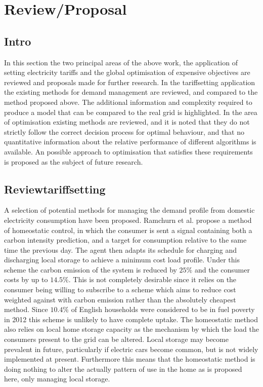 \documentclass[a4paper, 10 pt, conference]{ieeeconf}  %
\begin{document}





\onecolumn
\large
\section{Review/Proposal}
\doublespacing
\subsection{Intro}
In this section the two principal areas of the above work, the application of setting electricity tariffs and the global optimisation of expensive objectives are reviewed and proposals made for further research.
In the tariffsetting application the existing methods for demand management are reviewed, and compared to the method proposed above. The additional information and complexity required to produce a model that can be compared to the real grid is highlighted.
In the area of optimisation existing methods are reviewed, and it is noted that they do not strictly follow the correct decision process for optimal behaviour, and that no quantitative information about the relative performance of different algorithms is available. An possible approach to optimisation that satisfies these requirements is proposed as the subject of future research.


\subsection{Reviewtariffsetting}
\label{reviewtariffset}
A selection of potential methods for managing the demand profile from domestic electricity consumption have been proposed. Ramchurn et al. \cite{ramchurn2011agenthomeo} propose a method of homeostatic control, in which the consumer is sent a signal containing both a carbon intensity prediction, and a target for consumption relative to the same time the previous day. The agent then adapts its schedule for charging and discharging local storage to achieve a minimum cost load profile. Under this scheme the carbon emission of the system is reduced by $25\%$ and the consumer costs by up to $14.5\%$. This is not completely desirable since it relies on the consumer being willing to subscribe to a scheme which aims to reduce cost weighted against with carbon emission rather than the absolutely cheapest method. Since $10.4\%$ of English households were considered to be in fuel poverty in 2012 \cite{govfuelpov} this scheme is unlikely to have complete uptake. The homeostatic method also relies on local home storage capacity as the mechanism by which the load the consumers present to the grid can be altered. Local storage may become prevalent in future, particularly if electric cars become common, but is not widely implemented at present. Furthermore this means that the homeostatic method is doing nothing to alter the actually pattern of use in the home as is proposed here, only managing local storage.
\end{document}
